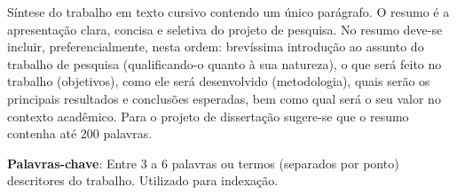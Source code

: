 %
%

\begin{resumo}

Síntese do trabalho em texto cursivo contendo um único parágrafo. O resumo é a apresentação clara, concisa e seletiva do projeto de pesquisa.
No resumo deve-se incluir, preferencialmente, nesta ordem: brevíssima introdução ao assunto do trabalho de pesquisa (qualificando-o quanto à sua natureza), o que será feito no trabalho (objetivos), como ele será desenvolvido (metodologia), quais serão os principais resultados e conclusões esperadas, bem como qual será o seu valor no contexto acadêmico. Para o projeto de dissertação sugere-se que o resumo contenha até 200 palavras.

\textbf{Palavras-chave}: Entre 3 a 6 palavras ou termos (separados por ponto) descritores do trabalho. Utilizado para indexação.

\end{resumo}
